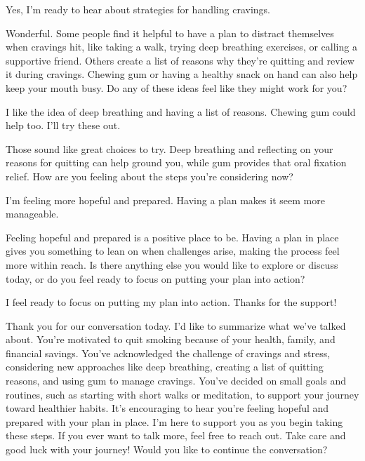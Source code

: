 \begin{clientbox}
	Yes, I'm ready to hear about strategies for handling cravings.
\end{clientbox}

\begin{counsellorbox}
	Wonderful. Some people find it helpful to have a plan to distract themselves when cravings hit, like taking a walk, trying deep breathing exercises, or calling a supportive friend. Others create a list of reasons why they're quitting and review it during cravings. Chewing gum or having a healthy snack on hand can also help keep your mouth busy. Do any of these ideas feel like they might work for you?
\end{counsellorbox}

\begin{clientbox}
	I like the idea of deep breathing and having a list of reasons. Chewing gum could help too. I'll try these out.
\end{clientbox}

\begin{counsellorbox}
	Those sound like great choices to try. Deep breathing and reflecting on your reasons for quitting can help ground you, while gum provides that oral fixation relief. How are you feeling about the steps you're considering now?
\end{counsellorbox}

\begin{clientbox}
	I'm feeling more hopeful and prepared. Having a plan makes it seem more manageable.
\end{clientbox}

\begin{counsellorbox}
	Feeling hopeful and prepared is a positive place to be. Having a plan in place gives you something to lean on when challenges arise, making the process feel more within reach. Is there anything else you would like to explore or discuss today, or do you feel ready to focus on putting your plan into action?
\end{counsellorbox}

\begin{clientbox}
	I feel ready to focus on putting my plan into action. Thanks for the support!
\end{clientbox}

\begin{counsellorbox}
	Thank you for our conversation today. I'd like to summarize what we've talked about. You're motivated to quit smoking because of your health, family, and financial savings. You've acknowledged the challenge of cravings and stress, considering new approaches like deep breathing, creating a list of quitting reasons, and using gum to manage cravings. You've decided on small goals and routines, such as starting with short walks or meditation, to support your journey toward healthier habits. It's encouraging to hear you're feeling hopeful and prepared with your plan in place. I'm here to support you as you begin taking these steps. If you ever want to talk more, feel free to reach out. Take care and good luck with your journey! Would you like to continue the conversation?
\end{counsellorbox}

